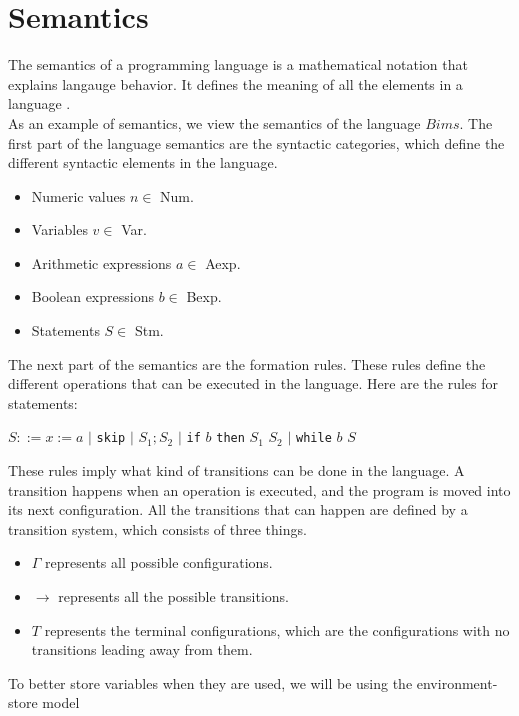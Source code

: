 \section{Semantics}
\label{sec:semantics}

The semantics of a programming language is a mathematical notation that explains langauge behavior. 
It defines the meaning of all the elements in a language \cite{misc:sem}.\\ \indent
As an example of semantics, we view the semantics of the language $Bims$. 
The first part of the language semantics are the syntactic categories, which define the different syntactic elements in the language.

\begin{itemize}
\item Numeric values $n \in$ Num.
\item Variables $v \in$ Var.
\item Arithmetic expressions $a \in$ Aexp.
\item Boolean expressions $b \in$ Bexp.
\item Statements $S \in$ Stm.
\end{itemize}

The next part of the semantics are the formation rules. 
These rules define the different operations that can be executed in the language. 
Here are the rules for statements: \newline

$S ::= x := a$ $|$ \texttt{skip} $|$ $S_1;S_2$ $|$ \texttt{if} $b$ \texttt{then} $S_1$  $S_2$ $|$ \texttt{while} $b$  $S$\newline

These rules imply what kind of transitions can be done in the language. 
A transition happens when an operation is executed, and the program is moved into its next configuration. 
All the transitions that can happen are defined by a transition system, which consists of three things. 

\begin{itemize}
\item $\Gamma$ represents all possible configurations. 
\item $\rightarrow$ represents all the possible transitions.
\item $T$ represents the terminal configurations, which are the configurations with no transitions leading away from them.
\end{itemize}

To better store variables when they are used, we will be using the environment-store model